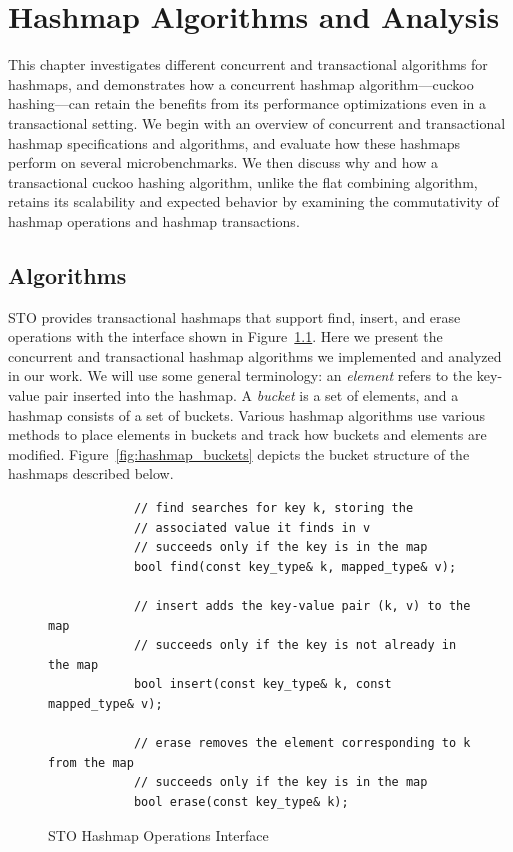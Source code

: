 \chapter{Hashmap Algorithms and Analysis}
\label{hashmap}

This chapter investigates different concurrent and transactional algorithms for hashmaps, and demonstrates how a concurrent hashmap algorithm---cuckoo hashing---can retain the benefits from its performance optimizations even in a transactional setting. We begin with an overview of concurrent and transactional hashmap specifications and algorithms, and evaluate how these hashmaps perform on several microbenchmarks. We then discuss why and how a transactional cuckoo hashing algorithm, unlike the flat combining algorithm, retains its scalability and expected behavior by examining the commutativity of hashmap operations and hashmap transactions.

\section{Algorithms}

STO provides transactional hashmaps that support find, insert, and erase operations with the interface shown in Figure~\ref{fig:hm_interface}. 
Here we present the concurrent and transactional hashmap algorithms we implemented and analyzed in our work. We will use some general terminology: an \emph{element} refers to the key-value pair inserted into the hashmap. A \emph{bucket} is a set of elements, and a hashmap consists of a set of buckets. Various hashmap algorithms use various methods to place elements in buckets and track how buckets and elements are modified. Figure~\ref{fig:hashmap_buckets} depicts the bucket structure of the hashmaps described below.

\begin{figure}[t]
    \centering
    \begin{lstlisting}
            // find searches for key k, storing the 
            // associated value it finds in v
            // succeeds only if the key is in the map
            bool find(const key_type& k, mapped_type& v); 
           
            // insert adds the key-value pair (k, v) to the map
            // succeeds only if the key is not already in the map
            bool insert(const key_type& k, const mapped_type& v); 

            // erase removes the element corresponding to k from the map
            // succeeds only if the key is in the map
            bool erase(const key_type& k); 
    \end{lstlisting}
    \caption{STO Hashmap Operations Interface}
    \label{fig:hm_interface}
\end{figure}

